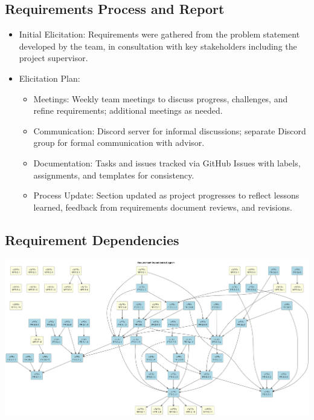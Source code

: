 \documentclass{article}
\begin{document}
\subsection{Requirements Process and Report}\label{subsec:reqprocess}
\begin{itemize}
    \item {Initial Elicitation}: Requirements were gathered from the problem statement developed by the team, in consultation with key stakeholders including the project supervisor.
    \item {Elicitation Plan}:
    \begin{itemize}
        \item Meetings: Weekly team meetings to discuss progress, challenges, and refine requirements; additional meetings as needed.
        \item Communication: Discord server for informal discussions; separate Discord group for formal communication with advisor.
        \item Documentation: Tasks and issues tracked via GitHub Issues with labels, assignments, and templates for consistency.
        \item Process Update: Section updated as project progresses to reflect lessons learned, feedback from requirements document reviews, and revisions.
    \end{itemize}
\end{itemize}

\newpage




\begin{landscape}
    \section*{Requirement Dependencies}

    \centering

    \includegraphics[width=1.5\textheight]{requirement_dependency_diagram.png}

    \label{fig:requirements-diagram}
\end{landscape}
\end{document}
